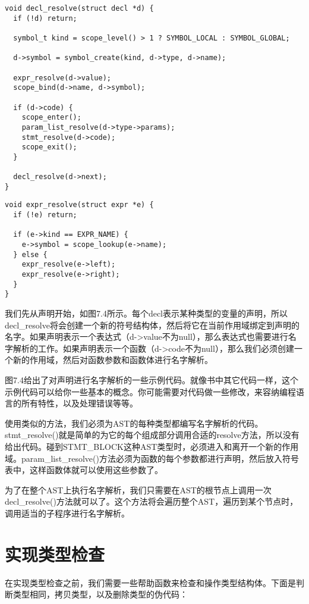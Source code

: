 \documentclass[cn,11pt,chinese]{elegantbook}
\begin{document}
\begin{verbatim}
void decl_resolve(struct decl *d) {
  if (!d) return;
    
  symbol_t kind = scope_level() > 1 ? SYMBOL_LOCAL : SYMBOL_GLOBAL;
  
  d->symbol = symbol_create(kind, d->type, d->name);
    
  expr_resolve(d->value);
  scope_bind(d->name, d->symbol);
    
  if (d->code) {
    scope_enter();
    param_list_resolve(d->type->params);
    stmt_resolve(d->code);
    scope_exit();
  }
    
  decl_resolve(d->next);
}
\end{verbatim}

\begin{verbatim}
void expr_resolve(struct expr *e) {
  if (!e) return;
    
  if (e->kind == EXPR_NAME) {
    e->symbol = scope_lookup(e->name);
  } else {
    expr_resolve(e->left);
    expr_resolve(e->right);
  }
}
\end{verbatim}

我们先从声明开始，如图7.4所示。每个decl表示某种类型的变量的声明，所以decl\_resolve将会创建一个新的符号结构体，然后将它在当前作用域绑定到声明的名字。如果声明表示一个表达式（d->value不为null），那么表达式也需要进行名字解析的工作。如果声明表示一个函数（d->code不为null），那么我们必须创建一个新的作用域，然后对函数参数和函数体进行名字解析。

图7.4给出了对声明进行名字解析的一些示例代码。就像书中其它代码一样，这个示例代码可以给你一些基本的概念。你可能需要对代码做一些修改，来容纳编程语言的所有特性，以及处理错误等等。

使用类似的方法，我们必须为AST的每种类型都编写名字解析的代码。stmt\_resolve()就是简单的为它的每个组成部分调用合适的resolve方法，所以没有给出代码。碰到STMT\_BLOCK这种AST类型时，必须进入和离开一个新的作用域。param\_list\_resolve()方法必须为函数的每个参数都进行声明，然后放入符号表中，这样函数体就可以使用这些参数了。

为了在整个AST上执行名字解析，我们只需要在AST的根节点上调用一次decl\_resolve()方法就可以了。这个方法将会遍历整个AST，遍历到某个节点时，调用适当的子程序进行名字解析。

\section{实现类型检查}

在实现类型检查之前，我们需要一些帮助函数来检查和操作类型结构体。下面是判断类型相同，拷贝类型，以及删除类型的伪代码：
\end{document}

